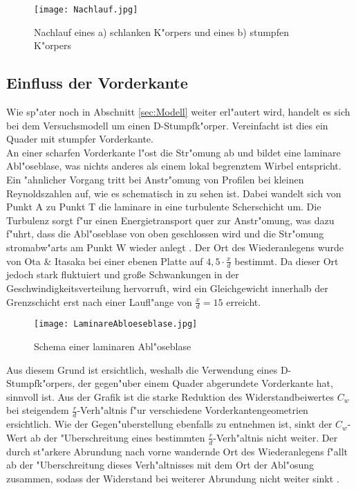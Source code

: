 \begin{figure}[h]
	\centering
	\texttt{[image: Nachlauf.jpg]}
	\caption{Nachlauf eines a) schlanken K"orpers und eines b) stumpfen K"orpers \cite{Hucho.2011}}
	\label{fig:Nachlauf}
\end{figure}



\subsection{Einfluss der Vorderkante} 
\label{sec:Vorderkante}
Wie sp"ater noch in Abschnitt \ref{sec:Modell} weiter erl"autert wird, handelt es sich bei dem Versuchsmodell um einen D-Stumpfk"orper. Vereinfacht ist dies ein Quader mit stumpfer Vorderkante.\\ 
An einer scharfen Vorderkante l"ost die Str"omung ab und bildet eine laminare Abl"oseblase, was nichts anderes als einem lokal begrenztem Wirbel entspricht. Ein "ahnlicher Vorgang tritt bei Anstr"omung von Profilen bei kleinen Reynoldszahlen auf, wie es schematisch in  zu sehen ist. Dabei wandelt sich von Punkt A zu Punkt T die laminare in eine turbulente Scherschicht um. Die Turbulenz sorgt f"ur einen Energietransport quer zur Anstr"omung, was dazu f"uhrt, dass die Abl"oseblase von oben geschlossen wird und die Str"omung stromabw"arts am Punkt W wieder anlegt \cite{Siegman.2015}. Der Ort des Wiederanlegens wurde von Ota \& Itasaka \cite{Ota.1976} bei einer ebenen Platte auf $4,5 \cdot \frac{x}{d}$ bestimmt. Da dieser Ort jedoch stark fluktuiert und gro\ss{}e Schwankungen in der Geschwindigkeitsverteilung hervorruft, wird ein Gleichgewicht innerhalb der Grenzschicht erst nach einer Laufl"ange von $\frac{x}{d} = 15$ erreicht.
  
\begin{figure}[h]
	\centering
	\texttt{[image: LaminareAbloeseblase.jpg]}
	\caption{Schema einer laminaren Abl"oseblase \cite{Siegman.2015}}
	\label{fig:LamBlase}
\end{figure}

Aus diesem Grund ist ersichtlich, weshalb die Verwendung eines D-Stumpfk"orpers, der gegen"uber einem Quader abgerundete  Vorderkante hat, sinnvoll ist. Aus der Grafik  ist die starke Reduktion des Widerstandbeiwertes $C_w$ bei steigendem $\frac{r}{d}$-Verh"altnis f"ur verschiedene Vorderkantengeometrien ersichtlich. Wie der Gegen"uberstellung  ebenfalls zu entnehmen ist, sinkt der $C_w$-Wert ab der "Uberschreitung eines bestimmten $\frac{r}{d}$-Verh"altnis nicht weiter. Der durch st"arkere Abrundung nach vorne wandernde Ort des Wiederanlegens f"allt ab der "Uberschreitung dieses Verh"altnisses mit dem Ort der Abl"osung zusammen, sodass der Widerstand bei weiterer Abrundung nicht weiter sinkt \cite{Hucho.2011}.  

